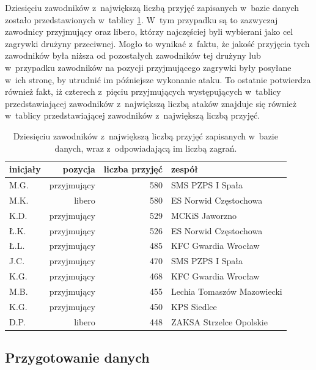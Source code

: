 \documentclass[a4paper,twoside,12pt]{book}
\begin{document}
Dziesięciu zawodników z~największą liczbą przyjęć zapisanych w~bazie danych zostało przedstawionych w~tablicy \ref{tab:liczbaZagranPrzyjecie}. W~tym przypadku są to zazwyczaj zawodnicy przyjmujący oraz libero, którzy najczęściej byli wybierani jako cel zagrywki drużyny przeciwnej. Mogło to wynikać z~faktu, że jakość przyjęcia tych zawodników była niższa od pozostałych zawodników tej drużyny lub w~przypadku zawodników na pozycji przyjmującego zagrywki były posyłane w~ich stronę, by utrudnić im późniejsze wykonanie ataku. To ostatnie potwierdza również fakt, iż czterech z~pięciu przyjmujących występujących w~tablicy przedstawiającej zawodników z~największą liczbą ataków znajduje się również w~tablicy przedstawiającej zawodników z~największą liczbą przyjęć.

\begin{table}
\centering
\caption{Dziesięciu zawodników z~największą liczbą przyjęć zapisanych w~bazie danych, wraz z~odpowiadającą im liczbą zagrań.}
\label{tab:liczbaZagranPrzyjecie}
\begin{tabular}{lrrl}
\hline
\toprule
{inicjały} & {pozycja} & {liczba przyjęć} & {zespół} \\
\midrule
M.G. & przyjmujący & 580 & SMS PZPS I Spała \\ 
M.K. & libero & 580 & ES Norwid Częstochowa \\ 
K.D. & przyjmujący & 529 & MCKiS Jaworzno  \\ 
Ł.K. & przyjmujący & 526 & ES Norwid Częstochowa \\ 
Ł.L. & przyjmujący & 485 & KFC Gwardia Wrocław \\ 
J.C. & przyjmujący & 470 & SMS PZPS I Spała \\
K.G. & przyjmujący & 468 & KFC Gwardia Wrocław \\ 
M.B. & przyjmujący & 455 & Lechia Tomaszów Mazowiecki \\
K.G. & przyjmujący & 450 & KPS Siedlce \\ 
D.P. & libero & 448 & ZAKSA Strzelce Opolskie \\
\bottomrule 
\end{tabular}
\end{table}

\subsection{Przygotowanie danych}
\label{roz:przygotowanie-danych}
\end{document}
